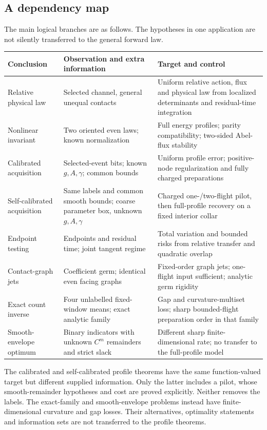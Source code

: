 \subsection{A dependency map}
The main logical branches are as follows. The hypotheses in one
application are not silently transferred to the general forward law.
\begin{longtable}{@{}p{}p{}p{}@{}}
\toprule
Conclusion & Observation and extra information & Target and control\\
\midrule
\endhead
Relative physical law & Selected channel, general unequal contacts &
Uniform relative action, flux and physical law from localized determinants
and residual-time integration\\[3pt]
Nonlinear invariant & Two oriented even laws; known normalization &
Full energy profiles; parity compatibility; two-sided Abel-flux stability\\[3pt]
Calibrated acquisition & Selected-event bits; known $g,A,\gamma$;
common bounds & Uniform profile error; positive-node regularization and
fully charged preparations\\[3pt]
Self-calibrated acquisition & Same labels and common smooth bounds;
coarse parameter box, unknown $g,A,\gamma$ & Charged one-/two-flight
pilot, then full-profile recovery on a fixed interior collar\\[3pt]
Endpoint testing & Endpoints and residual time; joint tangent regime &
Total variation and bounded risks from relative transfer and quadratic
overlap\\[3pt]
Contact-graph jets & Coefficient germ; identical even facing graphs &
Fixed-order graph jets; one-flight input sufficient; analytic germ rigidity\\[3pt]
Exact count inverse & Four unlabelled fixed-window means; exact analytic
family & Gap and curvature-multiset loss; sharp bounded-flight preparation
order in that family\\[3pt]
Smooth-envelope optimum & Binary indicators with unknown $C^m$
remainders and strict slack & Different sharp finite-dimensional rate;
no transfer to the full-profile model\\
\bottomrule
\end{longtable}

The calibrated and self-calibrated profile theorems have the same
function-valued target but different supplied information. Only the
latter includes a pilot, whose smooth-remainder hypotheses and cost are
proved explicitly. Neither removes the labels. The exact-family and
smooth-envelope problems instead have finite-dimensional curvature and
gap losses. Their alternatives, optimality statements and information
sets are not transferred to the profile theorems.

